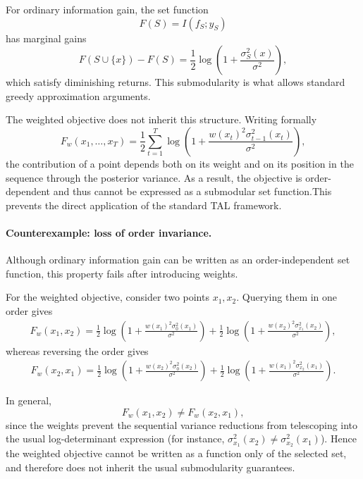 For ordinary information gain, the set function
\begin{equation*}
F(S)=I(f_S;y_S)
\end{equation*}
has marginal gains
\begin{equation*}
F(S\cup\{x\})-F(S)
=
\frac12
\log\!\left(
1+\frac{\sigma_S^2(x)}{\sigma^2}
\right),
\end{equation*}
which satisfy diminishing returns. This submodularity is what allows standard greedy approximation arguments.

The weighted objective does not inherit this structure. Writing formally
$$
F_w(x_1,\dots,x_T)
=
\frac12
\sum_{t=1}^T
\log\left(
1+
\frac{
w(x_t)^2\sigma_{t-1}^2(x_t)
}{
\sigma^2
}
\right),
$$
the contribution of a point depends both on its weight and on its position in the sequence through the posterior variance. As a result, the objective is order-dependent and thus cannot be expressed as a submodular set function.This prevents the direct application of the standard TAL framework.

\paragraph{Counterexample: loss of order invariance.}

Although ordinary information gain can be written as an order-independent set function, this property fails after introducing weights.

For the weighted objective, consider two points $x_1,x_2$. Querying them in
one order gives
\begin{align*}
F_w(x_1,x_2)
=
\frac12\log\left(
1+\frac{w(x_1)^2\sigma_0^2(x_1)}{\sigma^2}
\right)
+
\frac12\log\left(
1+\frac{w(x_2)^2\sigma_{x_1}^2(x_2)}{\sigma^2}
\right),
\end{align*}
whereas reversing the order gives
\begin{align*}
F_w(x_2,x_1)
=
\frac12\log\left(
1+\frac{w(x_2)^2\sigma_0^2(x_2)}{\sigma^2}
\right)
+
\frac12\log\left(
1+\frac{w(x_1)^2\sigma_{x_2}^2(x_1)}{\sigma^2}
\right).
\end{align*}

In general,
\begin{equation*}
F_w(x_1,x_2)\neq F_w(x_2,x_1),
\end{equation*}
since the weights prevent the sequential variance reductions from
telescoping into the usual log-determinant expression (for instance, $\sigma_{x_1}^2(x_2) \neq \sigma_{x_2}^2(x_1)$). Hence the weighted objective cannot be written as a function
only of the selected set, and therefore does not inherit the usual
submodularity guarantees.